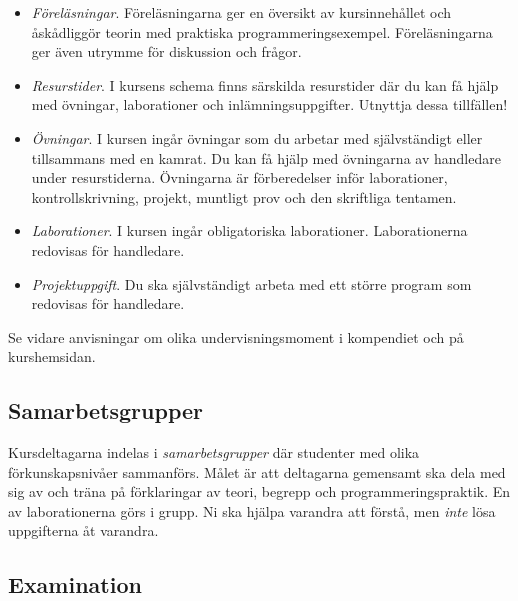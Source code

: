 \documentclass[a4paper,12pt,oneside]{memoir}
\begin{document}
\begin{itemize}
\item
  \emph{Föreläsningar}. Föreläsningarna ger en översikt av
  kursinnehållet och åskådliggör teorin med praktiska
  programmeringsexempel. Föreläsningarna ger även utrymme för diskussion
  och frågor.
\item
  \emph{Resurstider}. I kursens schema finns särskilda resurstider
  där du kan få hjälp med övningar, laborationer och
  inlämningsuppgifter. Utnyttja dessa tillfällen!
\item
  \emph{Övningar}. I kursen ingår övningar som du arbetar med
  självständigt eller tillsammans med en kamrat.
  Du kan få hjälp med övningarna av handledare under resurstiderna.
  Övningarna är förberedelser inför laborationer, kontrollskrivning, projekt, muntligt prov och den skriftliga tentamen.
\item
  \emph{Laborationer}. I kursen ingår obligatoriska laborationer.
  Laborationerna redovisas för handledare.
\item
  \emph{Projektuppgift}. Du ska självständigt arbeta med ett större
  program som redovisas för handledare. %
\end{itemize}
Se vidare anvisningar om olika undervisningsmoment i kompendiet och på kurshemsidan.

\subsection{Samarbetsgrupper}\label{samarbetsgrupper}

Kursdeltagarna indelas i \emph{samarbetsgrupper} där studenter med olika förkunskapsnivåer
sammanförs. Målet är att deltagarna gemensamt ska
dela med sig av och träna på förklaringar av teori, begrepp och
programmeringspraktik. En av laborationerna görs i grupp. Ni ska hjälpa varandra att
förstå, men \emph{inte} lösa uppgifterna åt varandra.

\subsection{Examination}\label{examination}
\end{document}
